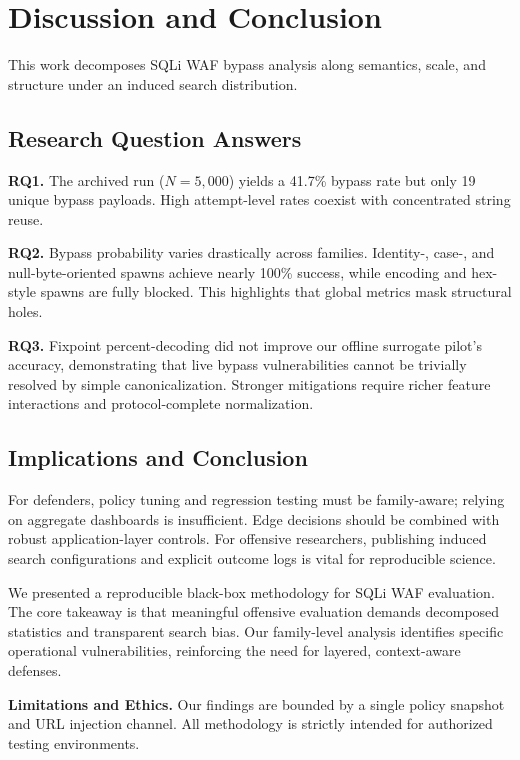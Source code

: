 \section{Discussion and Conclusion}
\label{sec:discussion}
This work decomposes SQLi WAF bypass analysis along semantics, scale, and structure under an induced search distribution.

\subsection{Research Question Answers}
\textbf{RQ1.} The archived run ($N=5{,}000$) yields a 41.7\% bypass rate but only 19 unique bypass payloads. High attempt-level rates coexist with concentrated string reuse.

\textbf{RQ2.} Bypass probability varies drastically across families. Identity-, case-, and null-byte-oriented spawns achieve nearly 100\% success, while encoding and hex-style spawns are fully blocked. This highlights that global metrics mask structural holes.

\textbf{RQ3.} Fixpoint percent-decoding did not improve our offline surrogate pilot's accuracy, demonstrating that live bypass vulnerabilities cannot be trivially resolved by simple canonicalization. Stronger mitigations require richer feature interactions and protocol-complete normalization.

\subsection{Implications and Conclusion}
For defenders, policy tuning and regression testing must be family-aware; relying on aggregate dashboards is insufficient. Edge decisions should be combined with robust application-layer controls. For offensive researchers, publishing induced search configurations and explicit outcome logs is vital for reproducible science.

We presented a reproducible black-box methodology for SQLi WAF evaluation. The core takeaway is that meaningful offensive evaluation demands decomposed statistics and transparent search bias. Our family-level analysis identifies specific operational vulnerabilities, reinforcing the need for layered, context-aware defenses.

\textbf{Limitations and Ethics.} Our findings are bounded by a single policy snapshot and URL injection channel. All methodology is strictly intended for authorized testing environments.
